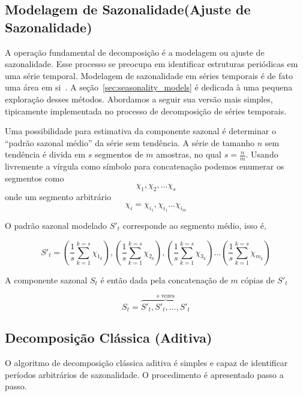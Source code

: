 

\subsection{Modelagem de Sazonalidade(Ajuste de Sazonalidade)}

A operação fundamental de decomposição é a modelagem ou ajuste de sazonalidade.
Esse processo se preocupa em identificar estruturas periódicas em uma série
temporal. Modelagem de sazonalidade em séries temporais é de fato uma área em
si~\cite{seasonal_modelling}. A seção~\ref{sec:seasonality_models} é dedicada
à uma pequena exploração desses métodos. Abordamos a seguir sua versão mais
simples, tipicamente implementada no processo de decomposição de séries
temporais.

Uma possibilidade para estimativa da componente sazonal é determinar o ``padrão
sazonal médio'' da série sem tendência. A série de tamanho $n$ sem tendência é
divida em $s$ segmentos de $m$ amostras, no qual $s = \frac{n}{m}$. Usando
livremente a vírgula como símbolo para concatenação podemos enumerar os
segmentos como $$\chi_1, \chi_2, ... \chi_s$$ onde um segmento arbitrário
$$\chi_i = \chi_{i_{1}}, \chi_{i_{1}} ... \chi_{i_{m}}$$

O padrão sazonal modelado $S'_t$ corresponde ao segmento médio, isso é,

$$ S'_t = \left(\frac{1}{s} \sum_{k=1}^{k=s} \chi_{1_{k}}\right), \left(\frac{1}{s} \sum_{k=1}^{k=s} \chi_{2_{k}}\right), \left(\frac{1}{s} \sum_{k=1}^{k=s} \chi_{3_{k}}\right) \hdots \left(\frac{1}{s} \sum_{k=1}^{k=s} \chi_{m_{k}}\right)$$

A componente sazonal $S_t$ é então dada pela concatenação de $m$ cópias de
$S'_t$

$$ S_t = \overbrace{S'_t, S'_t, \hdots, S'_t}^{s\text{ vezes}} $$

\subsection{Decomposição Clássica (Aditiva)}\label{ssec:classical_decomposition}

O algoritmo de decomposição clássica aditiva é simples e capaz de identificar
períodos arbitrários de sazonalidade. O procedimento é apresentado passo a
passo.

